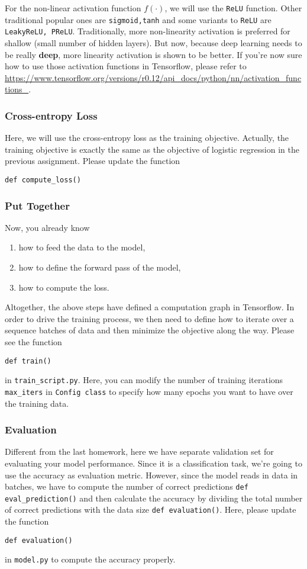 \documentclass[letterpaper]{article}
\begin{document}
For the non-linear activation function $f(\cdot)$, we will use the \verb|ReLU|
function. Other traditional popular ones are \verb|sigmoid,tanh| and some
variants to \verb|ReLU| are \verb|LeakyReLU, PReLU|. Traditionally, more
non-linearity activation is preferred for shallow (small number of hidden
layers). But now, because deep learning needs to be really \textbf{deep}, more
linearity activation is shown to be better. If you're now sure how to use those
activation functions in Tensorflow, please refer to
\url{https://www.tensorflow.org/versions/r0.12/api_docs/python/nn/activation_functions_}.

\subsubsection{Cross-entropy Loss}
Here, we will use the cross-entropy loss as the training objective. Actually,
the training objective is exactly the same as the objective of logistic
regression in the previous assignment. Please update the function
\begin{verbatim}
def compute_loss()
\end{verbatim}

\subsubsection{Put Together}
Now, you already know
\begin{enumerate}
	\item how to feed the data to the model,
	\item how to define the forward pass of the model,
	\item how to compute the loss.
\end{enumerate}
Altogether, the above steps have defined a computation graph in Tensorflow. In
order to drive the training process, we then need to define how to iterate over
a sequence batches of data and then minimize the objective along the way. Please see
the function
\begin{verbatim}
def train()
\end{verbatim} in \verb|train_script.py|. Here, you can modify the number of
training iterations \verb|max_iters| in \verb|Config class| to specify how many
epochs you want to have over the training data.

\subsubsection{Evaluation}
Different from the last homework, here we have separate validation set for
evaluating your model performance. Since it is a classification task, we're
going to use the accuracy as evaluation metric. However, since the model reads
in data in batches, we have to compute the number of correct predictions
\verb|def eval_prediction()| and
then calculate the accuracy by dividing the total number of correct predictions
with the data size \verb|def evaluation()|. Here, please update the function
\begin{verbatim}
def evaluation()
\end{verbatim} in \verb|model.py| to compute the accuracy properly.
\end{document}
